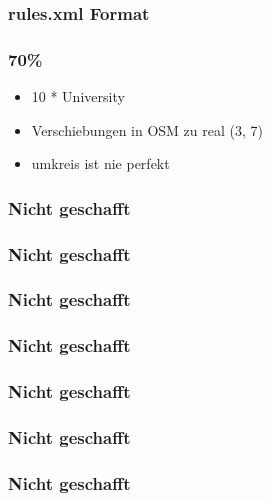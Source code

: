 \begin{frame}[fragile]
  \frametitle{rules.xml Format}
  \lstset{language=XML,basicstyle=\scriptsize}
  
\end{frame}


\begin{frame}
 \frametitle{70\%}
    \begin{itemize}
	\item 10 * University
	\item Verschiebungen in OSM zu real (3, 7)
	\item umkreis ist nie perfekt
    \end{itemize}
\end{frame}

\begin{frame}
 \frametitle{Nicht geschafft}
\end{frame}


\begin{frame}
 \frametitle{Nicht geschafft}
\end{frame}


\begin{frame}
 \frametitle{Nicht geschafft}
\end{frame}


\begin{frame}
 \frametitle{Nicht geschafft}
\end{frame}


\begin{frame}
 \frametitle{Nicht geschafft}
\end{frame}


\begin{frame}
 \frametitle{Nicht geschafft}
\end{frame}


\begin{frame}
 \frametitle{Nicht geschafft}
\end{frame}


